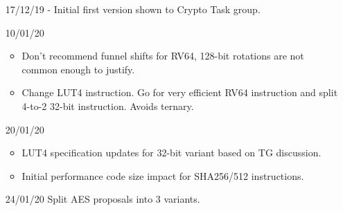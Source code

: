 
\begin{itemize}
\item[17/12/19] - Initial first version shown to Crypto Task group.
\item[10/01/20] \begin{itemize}
    \item Don't recommend funnel shifts for RV64, 128-bit rotations
          are not common enough to justify.
    \item Change LUT4 instruction. Go for very efficient RV64 instruction
          and split 4-to-2 32-bit instruction. Avoids ternary.
    \end{itemize}
\item[20/01/20] \begin{itemize}
    \item LUT4 specification updates for 32-bit variant based on TG discussion.
    \item Initial performance code size impact for SHA256/512 instructions.
    \end{itemize}
\item[24/01/20] Split AES proposals into 3 variants.
\end{itemize}
